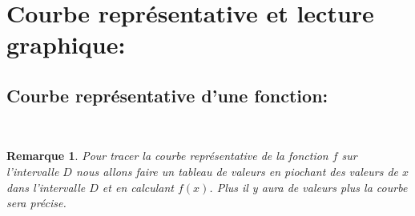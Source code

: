 \documentclass[a4paper,10.5pt]{article}
\newtheorem{defi}{Définition}
\newtheorem{rmq}{Remarque}
\begin{document}
\section{Courbe représentative et lecture graphique:}

\subsection{Courbe représentative d'une fonction:}

\noindent{}\hfill\\

\begin{rmq}
	Pour tracer la courbe représentative de la fonction $f$ sur l'intervalle $D$ nous allons faire un tableau de valeurs en piochant des valeurs de $x$ dans l'intervalle $D$ et en calculant $f(x)$. Plus il y aura de valeurs plus la courbe sera précise. 
\end{rmq}
\end{document}
